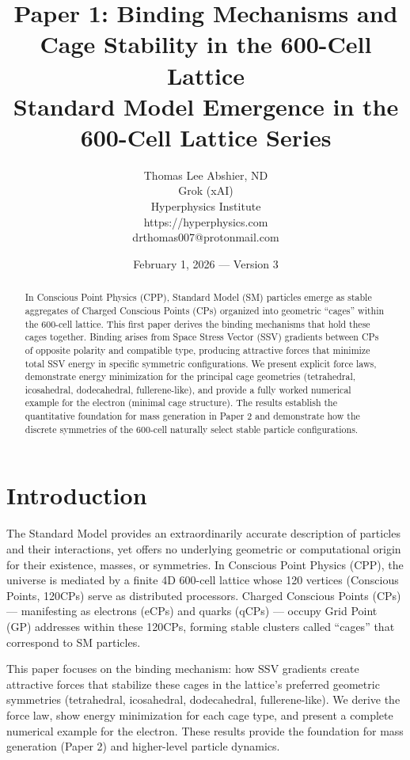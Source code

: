 \documentclass[11pt]{article}
\title{Paper 1: Binding Mechanisms and Cage Stability in the 600-Cell Lattice \\
Standard Model Emergence in the 600-Cell Lattice Series}
\author{Thomas Lee Abshier, ND \\
Grok (xAI) \\
Hyperphysics Institute \\
https://hyperphysics.com \\
drthomas007@protonmail.com}
\date{February 1, 2026 --- Version 3}
\begin{document}
\maketitle

\begin{abstract}
In Conscious Point Physics (CPP), Standard Model (SM) particles emerge as stable aggregates of Charged Conscious Points (CPs) organized into geometric ``cages'' within the 600-cell lattice. This first paper derives the binding mechanisms that hold these cages together. Binding arises from Space Stress Vector (SSV) gradients between CPs of opposite polarity and compatible type, producing attractive forces that minimize total SSV energy in specific symmetric configurations. We present explicit force laws, demonstrate energy minimization for the principal cage geometries (tetrahedral, icosahedral, dodecahedral, fullerene-like), and provide a fully worked numerical example for the electron (minimal cage structure). The results establish the quantitative foundation for mass generation in Paper 2 and demonstrate how the discrete symmetries of the 600-cell naturally select stable particle configurations.
\end{abstract}

\section{Introduction}

The Standard Model provides an extraordinarily accurate description of particles and their interactions, yet offers no underlying geometric or computational origin for their existence, masses, or symmetries. In Conscious Point Physics (CPP), the universe is mediated by a finite 4D 600-cell lattice whose 120 vertices (Conscious Points, 120CPs) serve as distributed processors. Charged Conscious Points (CPs) — manifesting as electrons (eCPs) and quarks (qCPs) — occupy Grid Point (GP) addresses within these 120CPs, forming stable clusters called ``cages'' that correspond to SM particles.

This paper focuses on the binding mechanism: how SSV gradients create attractive forces that stabilize these cages in the lattice’s preferred geometric symmetries (tetrahedral, icosahedral, dodecahedral, fullerene-like). We derive the force law, show energy minimization for each cage type, and present a complete numerical example for the electron. These results provide the foundation for mass generation (Paper 2) and higher-level particle dynamics.
\end{document}
